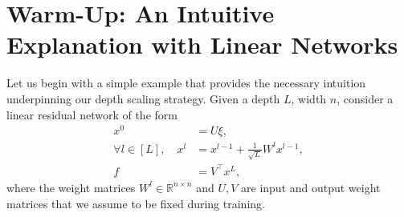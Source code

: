 \documentclass{article}
\theoremstyle{plain}
\theoremstyle{definition}
\begin{document}
 

\section{Warm-Up: An Intuitive Explanation with Linear Networks}\label{sec:intuition}

Let us begin with a simple example that provides the necessary intuition underpinning our depth scaling strategy. Given a depth $L$, width $n$, consider a linear residual network of the form
\begin{align*}
    x^0 & = U \xi, \\
    \forall l\in [L], \quad x^l & = x^{l - 1} + \frac1{\sqrt L} W^{l} x^{l-1},  \\
    f &= V^\top x^L,
\end{align*}
where the weight matrices $W^l \in \mathbb{R}^{n\times n}$ and $U, V$ are input and output weight matrices that we assume to be fixed during training. 
\end{document}
